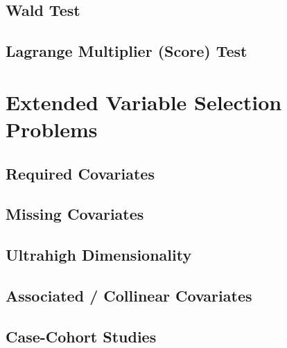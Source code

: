 \subsection{Wald Test}
\subsection{Lagrange Multiplier (Score) Test}

\section{Extended Variable Selection Problems}
\subsection{Required Covariates}
\subsection{Missing Covariates}
\subsection{Ultrahigh Dimensionality}
\subsection{Associated / Collinear Covariates}
\subsection{Case-Cohort Studies}

\fi